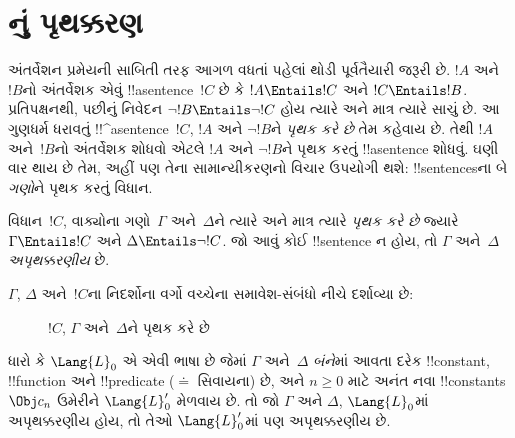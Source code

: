 \documentclass[../../../include/open-logic-section]{subfiles}
\begin{document}

\section{નું પૃથક્કરણ}

અંતર્વેશન પ્રમેયની સાબિતી તરફ આગળ વધતાં પહેલાં થોડી પૂર્વતૈયારી
જરૂરી છે. $!A$ અને~$!B$નો અંતર્વેશક એવું !!a{sentence}~$!C$ છે કે
$!A \Entails !C$ અને $!C \Entails !B$. પ્રતિપક્ષનથી, પછીનું નિવેદન
$\lnot !B \Entails \lnot !C$ હોય ત્યારે અને માત્ર ત્યારે સાચું છે.
આ ગુણધર્મ ધરાવતું !!^a{sentence}~$!C$, $!A$ અને $\lnot !B$ને
\emph{પૃથક કરે છે} તેમ કહેવાય છે. તેથી $!A$ અને~$!B$નો અંતર્વેશક
શોધવો એટલે $!A$ અને $\lnot !B$ને પૃથક કરતું !!a{sentence} શોધવું.
ઘણી વાર થાય છે તેમ, અહીં પણ તેના સામાન્યીકરણનો વિચાર ઉપયોગી થશે:
!!{sentence}sના બે \emph{ગણો}ને પૃથક કરતું વિધાન.

\begin{defn}
વિધાન~$!C$, વાક્યોના ગણો~$\Gamma$ અને~$\Delta$ને ત્યારે અને
માત્ર ત્યારે \emph{પૃથક કરે છે} જ્યારે $\Gamma \Entails !C$ અને
$\Delta \Entails \lnot !C$. જો આવું કોઈ !!{sentence} ન હોય, તો
$\Gamma$ અને~$\Delta$ \emph{અપૃથક્કરણીય} છે.
\end{defn}

$\Gamma$, $\Delta$ અને~$!C$ના નિદર્શોના વર્ગો વચ્ચેના સમાવેશ-સંબંધો
નીચે દર્શાવ્યા છે:
\begin{figure}[h]
  \centering
  \caption{$!C$, $\Gamma$ અને~$\Delta$ને પૃથક કરે છે}
\end{figure}


\begin{lem}
ધારો કે $\Lang{L}_0$ એ એવી ભાષા છે જેમાં $\Gamma$ અને~$\Delta$
\emph{બંને}માં આવતા દરેક !!{constant}, !!{function} અને !!{predicate}
($\doteq$ સિવાયના) છે, અને $n\ge 0$ માટે અનંત નવા !!{constant}s
$\Obj c_n$ ઉમેરીને $\Lang{L}'_0$ મેળવાય છે. તો જો $\Gamma$ અને
$\Delta$, $\Lang{L}_0$માં અપૃથક્કરણીય હોય, તો તેઓ $\Lang{L}'_0$માં
પણ અપૃથક્કરણીય છે.
\end{lem}
\end{document}
